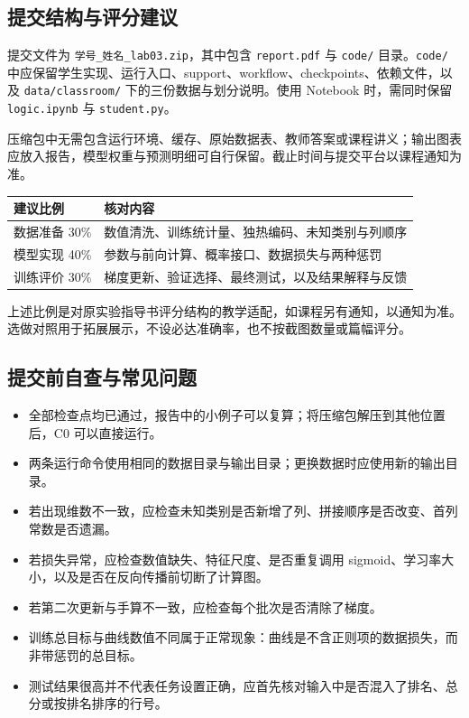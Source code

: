 \documentclass[UTF8,a4paper,11pt,fontset=fandol]{ctexart}
\newcommand{\file}[1]{\nolinkurl{#1}}
\begin{document}
\subsection{提交结构与评分建议}
提交文件为 \texttt{学号\_姓名\_lab03.zip}，其中包含 \texttt{report.pdf} 与 \file{code/} 目录。\file{code/} 中应保留学生实现、运行入口、support、workflow、checkpoints、依赖文件，以及 \file{data/classroom/} 下的三份数据与划分说明。使用 Notebook 时，需同时保留 \file{logic.ipynb} 与 \file{student.py}。

压缩包中无需包含运行环境、缓存、原始数据表、教师答案或课程讲义；输出图表应放入报告，模型权重与预测明细可自行保留。截止时间与提交平台以课程通知为准。
\par\noindent\begin{tabularx}{\linewidth}{L{1.8cm}Y}\toprule
建议比例 & 核对内容\\\midrule
数据准备 30\% & 数值清洗、训练统计量、独热编码、未知类别与列顺序\\
模型实现 40\% & 参数与前向计算、概率接口、数据损失与两种惩罚\\
训练评价 30\% & 梯度更新、验证选择、最终测试，以及结果解释与反馈\\\bottomrule
\end{tabularx}
上述比例是对原实验指导书评分结构的教学适配，如课程另有通知，以通知为准。选做对照用于拓展展示，不设必达准确率，也不按截图数量或篇幅评分。
\subsection{提交前自查与常见问题}
\begin{itemize}
\item 全部检查点均已通过，报告中的小例子可以复算；将压缩包解压到其他位置后，C0 可以直接运行。
\item 两条运行命令使用相同的数据目录与输出目录；更换数据时应使用新的输出目录。
\item 若出现维数不一致，应检查未知类别是否新增了列、拼接顺序是否改变、首列常数是否遗漏。
\item 若损失异常，应检查数值缺失、特征尺度、是否重复调用 sigmoid、学习率大小，以及是否在反向传播前切断了计算图。
\item 若第二次更新与手算不一致，应检查每个批次是否清除了梯度。
\item 训练总目标与曲线数值不同属于正常现象：曲线是不含正则项的数据损失，而非带惩罚的总目标。
\item 测试结果很高并不代表任务设置正确，应首先核对输入中是否混入了排名、总分或按排名排序的行号。
\end{itemize}
\end{document}
